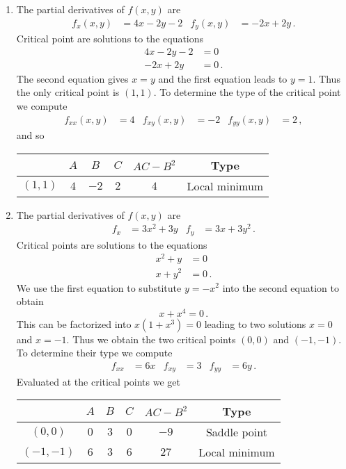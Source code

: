 \begin{solution}
\begin{enumerate}
\item
The partial derivatives of $f(x,y)$ are
\begin{align*}
f_x(x,y) &= 4x - 2y - 2 &
f_y(x,y) &= -2x + 2y\,.
\end{align*}
Critical point are solutions to the equations
\begin{align*}
4x - 2y - 2 &= 0 \\
-2x + 2y &= 0\,.
\end{align*}
The second equation gives $x=y$ and the first equation leads to $y=1$. Thus the only critical point is $(1,1)$. To determine the type of the critical point we compute
\begin{align*}
f_{xx}(x,y) &= 4 &
f_{xy}(x,y) &= -2 &
f_{yy}(x,y) &= 2\,,
\end{align*}
and so
\begin{center}
\begin{tabular}{c|ccc|cc}
 & $A$ & $B$ & $C$ & $AC-B^2$ & Type \\ \hline
$\left(1, 1\right)$ & $4$ & $-2$ & $2$ & $4$ & Local minimum
\end{tabular}
\end{center}

\item
The partial derivatives of $f(x,y)$ are
\begin{align*}
f_x &= 3x^2+3y &
f_y &= 3x+3y^2\,.
\end{align*}
Critical points are solutions to the equations
\begin{align*}
x^2+y &= 0 \\
x+y^2 &=0\,.
\end{align*}
We use the first equation to substitute $y=-x^2$ into the second equation to obtain
\[
x+x^4 = 0\,.
\]
This can be factorized into $x(1+x^3) =0$ leading to two solutions $x=0$ and $x=-1$. Thus we obtain the two critical points $(0,0)$ and $(-1,-1)$. To determine their type we compute
\begin{align*}
f_{xx} &= 6x &
f_{xy} &= 3 &
f_{yy} &= 6y\,.
\end{align*}
Evaluated at the critical points we get
\begin{center}
\begin{tabular}{c|ccc|cc}
 & $A$ & $B$ & $C$ & $AC-B^2$ & Type \\ \hline
$\left(0, 0\right)$ & $0$ & $3$ & $0$ & $-9$ & Saddle point \\
$\left(-1, -1\right)$ & $6$ & $3$ & $6$ & $27$ & Local minimum
\end{tabular}
\end{center}


\end{enumerate}
\end{solution}
